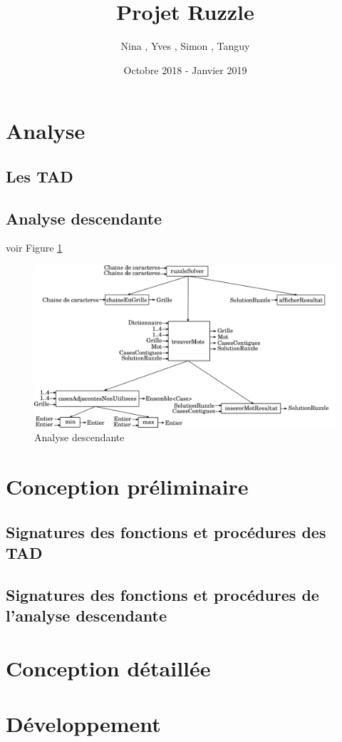 \documentclass[a4paper]{article}
\title{Projet Ruzzle}
\author{Nina \noun{Lardiere}, Yves \noun{Le Guennec}, Simon \noun{Lebeaud}, Tanguy \noun{Leclerc}}
\date{Octobre 2018 - Janvier 2019}
\begin{document}
	\maketitle
	\tableofcontents
	\newpage
	\section{Analyse}
		\subsection{Les TAD}
			

		\subsection{Analyse descendante}
			voir Figure \ref{fig:AD}
			\begin{figure}
				\centering \includegraphics[width=1\textwidth]{./analyseDescendante/analyseDescendante}
				\caption{\label{fig:AD}Analyse descendante}
			\end{figure}

	\newpage
	\section{Conception préliminaire}
		\subsection{Signatures des fonctions et procédures des TAD}
			
			
			
			

		\subsection{Signatures des fonctions et procédures de l'analyse descendante}
			

	\newpage
	\section{Conception détaillée}
		
		
		

	\newpage
	\section{Développement}
		
\end{document}
